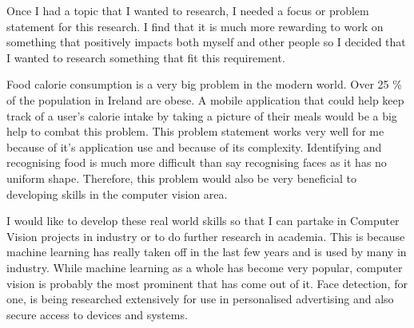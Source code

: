 Once I had a topic that I wanted to research, I needed a focus or problem statement for this research.
I find that it is much more rewarding to work on something that positively
impacts both myself and other people so I decided that I wanted to research
something that fit this requirement.

Food calorie consumption is a very big problem in the modern world.
Over 25 \% of the population in Ireland are obese.
A mobile application that could help keep track of a user's calorie intake by taking a picture of their meals would be a big help to combat this problem.
This problem statement works very well for me because of it's application use and because of its complexity.
Identifying and recognising food is much more difficult than say recognising faces as it has no uniform shape.
Therefore, this problem would also be very beneficial to developing skills in the computer vision area.

I would like to develop these real world skills so that I can partake in
Computer Vision projects in industry or to do further research in academia. This
is because machine learning has really taken off in the last few years and is
used by many in industry. While machine learning as a whole has become very
popular, computer vision is probably the most prominent that has come out of it.
Face detection, for one, is being researched extensively for use in personalised
advertising and also secure access to devices and systems.
